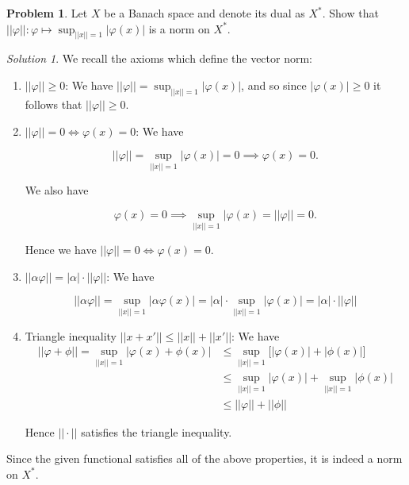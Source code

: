 \documentclass[12pt,a4paper]{article}
\theoremstyle{definition}
\newtheorem{problem}{Problem}
\theoremstyle{remark}
\newtheorem*{solution}{Solution}
\begin{document}
\begin{problem}
    Let $X$ be a Banach space and denote its dual as $X^*$. Show that $||\varphi||:\varphi \mapsto \sup_{||x||=1}|\varphi(x)|$ is a norm on $X^*$. 
\end{problem}
\begin{solution}
    We recall the axioms which define the vector norm:
    \begin{enumerate}
        \item $||\varphi|| \ge 0$: We have $||\varphi|| = \sup_{||x||=1}|\varphi(x)|$, and so since $|\varphi(x)| \ge 0$ it follows that $||\varphi|| \ge 0$. 
        \item $||\varphi||=0 \Leftrightarrow \varphi(x)=0$: We have 
        
        $$||\varphi|| = \sup_{||x||=1}|\varphi(x)| = 0 \implies \varphi(x)=0.$$ 
        
        We also have 
        
        $$\varphi(x) =0 \implies \sup_{||x||=1}|\varphi(x) = ||\varphi|| = 0.$$ 

        Hence we have $||\varphi||=0 \Leftrightarrow \varphi(x)=0$.
        \item $||\alpha \varphi|| = |\alpha| \cdot ||\varphi||$: We have 
        
        $$||\alpha \varphi|| = \sup_{||x|| =1}|\alpha \varphi(x)| = |\alpha| \cdot \sup_{||x||=1}|\varphi(x)| = |\alpha| \cdot ||\varphi||$$

        \item Triangle inequality $||x + x'|| \le ||x||+||x'||$: We have
        \begin{align*}
            ||\varphi + \phi|| = \sup_{||x||=1}|\varphi(x)+\phi(x)| &\le \sup_{||x||=1}\bigg[|\varphi(x)| + |\phi(x)|\bigg] \\
            &\le \sup_{||x||=1} |\varphi(x)| + \sup_{||x||=1}|\phi(x)|\\
            &\le ||\varphi|| + ||\phi||
        \end{align*}

        Hence $||\cdot||$ satisfies the triangle inequality.
    \end{enumerate}

    Since the given functional satisfies all of the above properties, it is indeed a norm on $X^*$. 
\end{solution}
\end{document}
